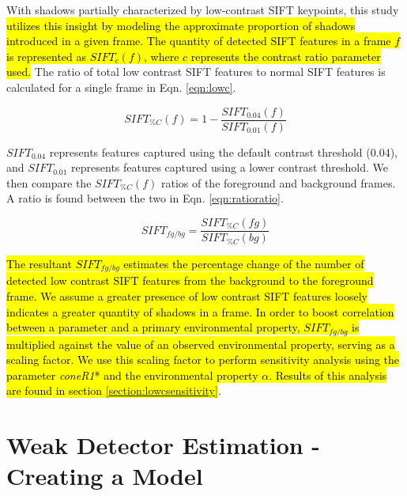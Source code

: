 \documentclass[12pt]{report}
\begin{document}
With shadows partially characterized by low-contrast SIFT keypoints, this study \hl{utilizes this insight by modeling the approximate proportion of shadows introduced in a given frame. The quantity of detected SIFT features in a frame $f$ is represented as $SIFT_{c}(f)$, where $c$ represents the contrast ratio parameter used. }
The ratio of total low contrast SIFT features to normal SIFT features is calculated for a single frame in Eqn. \ref{eqn:lowc}.

\begin{equation}
SIFT_{\%C}(f) = 1 - \dfrac{SIFT_{0.04}(f)}{SIFT_{0.01}(f)}
\label{eqn:lowc}
\end{equation}

$SIFT_{0.04}$ represents features captured using the default contrast threshold (0.04), and $SIFT_{0.01}$ represents features captured using a lower contrast threshold. We then compare the $SIFT_{\%C}(f)$ ratios of the foreground and background frames. A ratio is found between the two in Eqn. \ref{eqn:ratioratio}.

\begin{equation}
SIFT_{fg/bg} = \dfrac{SIFT_{\%C}(fg)}{SIFT_{\%C}(bg)}
\label{eqn:ratioratio}
\end{equation}

\hl{The resultant $SIFT_{fg/bg}$ estimates the percentage change of the number of detected low contrast SIFT features from the background to the foreground frame. We assume a greater presence of low contrast SIFT features loosely indicates a greater quantity of shadows in a frame. In order to boost correlation between a parameter and a primary environmental property, $SIFT_{fg/bg}$ is multiplied against the value of an observed environmental property, serving as a scaling factor. We use this scaling factor to perform sensitivity analysis using the parameter \textit{coneR1}* and the environmental property $\alpha$. Results of this analysis are found in section \ref{section:lowcsensitivity}}.

\section{Weak Detector Estimation - Creating a Model} \label{section:model}
\end{document}
